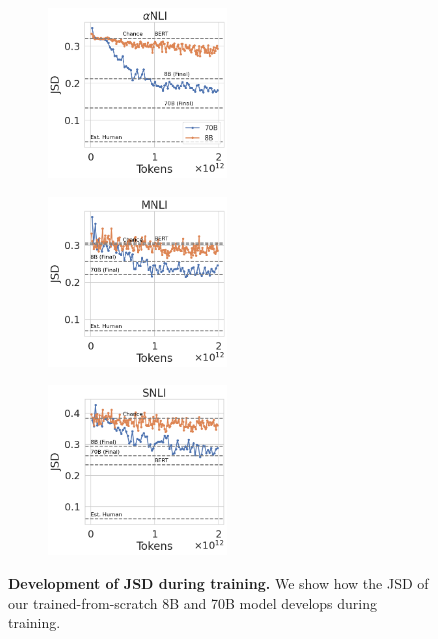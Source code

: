\begin{figure}[t]
    \centering
    \begin{subfigure}[b]{0.32\textwidth}
        \includegraphics[height=4.5cm]{figures/abductivenli_intermediate_jsd}
    \end{subfigure}
    \begin{subfigure}[b]{0.32\textwidth}
        \includegraphics[height=4.5cm, trim=11mm 0 0 0, clip]{figures/mnli_matched_intermediate_jsd}
    \end{subfigure}
    \begin{subfigure}[b]{0.32\textwidth}
        \includegraphics[height=4.5cm, trim=11mm 0 0 0, clip]{figures/snli_intermediate_jsd}
    \end{subfigure}
    \caption{\textbf{Development of JSD during training.} We show how the JSD of our trained-from-scratch 8B and 70B model develops during training.}\label{fig:jsd_training}
\end{figure}

